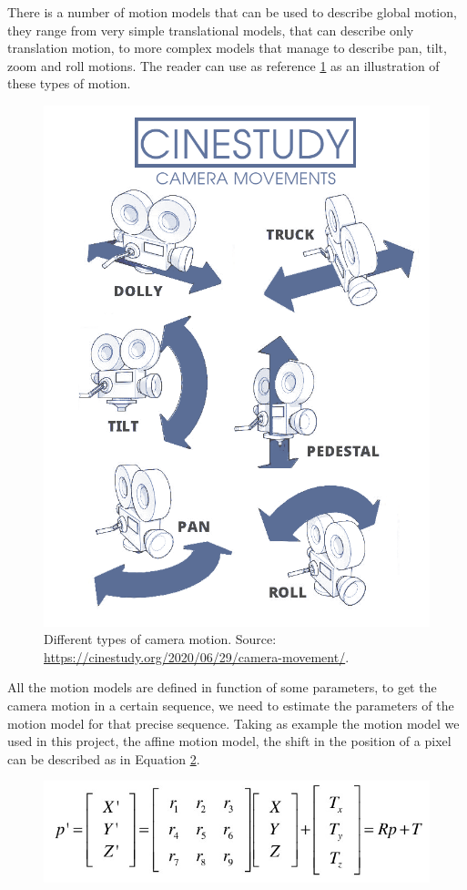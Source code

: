 There is a number of motion models that can be used to describe global motion, they range from very simple translational models, that can describe only translation motion, to more complex models that manage to describe pan, tilt, zoom and roll motions. The reader can use as reference \cref{fig:camera-motion} as an illustration of these types of motion.

\begin{figure}
    \centering
    \includegraphics[width=.7\linewidth]{../assets/images/camera-movement.png}
    \caption{Different types of camera motion. Source: \url{https://cinestudy.org/2020/06/29/camera-movement/}.}
    \label{fig:camera-motion}
\end{figure}

All the motion models are defined in function of some parameters, to get the camera motion in a certain sequence, we need to estimate the parameters of the motion model for that precise sequence. Taking as example the motion model we used in this project, the affine motion model, the shift in the position of a pixel can be described as in Equation \cref{fig:affine-model-representation}.

\begin{figure}[h]
    \centering
    \includegraphics[width=.9\linewidth]{../assets/images/affine-model.jpg}
    \caption{}
    \label{fig:affine-model-representation}
\end{figure}

